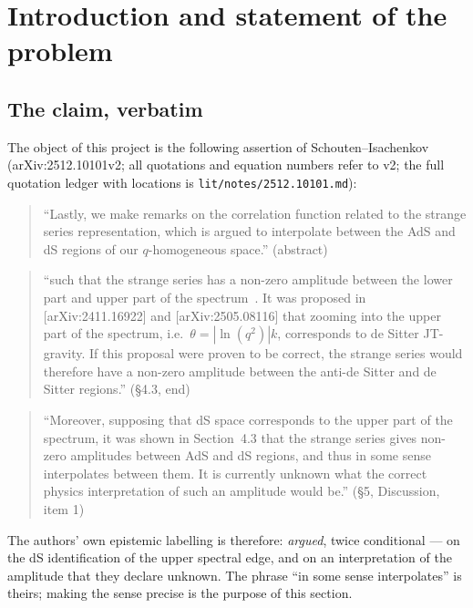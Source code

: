 \documentclass[11pt,a4paper]{article}
\theoremstyle{definition}
\theoremstyle{plain}
\begin{document}
\section{Introduction and statement of the problem}
\label{sec:intro}


\subsection{The claim, verbatim}
\label{sec:claimverbatim}

The object of this project is the following assertion of Schouten--Isachenkov
\cite{Schouten:2025dssyk} (arXiv:2512.10101v2; all quotations and equation numbers refer to v2;
the full quotation ledger with locations is \texttt{lit/notes/2512.10101.md}):

\begin{quote}
``Lastly, we make remarks on the correlation function related to the strange series
representation, which is argued to interpolate between the AdS and dS regions of our
$q$-homogeneous space.'' \hfill (abstract)
\end{quote}
\begin{quote}
``such that the strange series has a non-zero amplitude between the lower part and upper part of
the spectrum~. It was proposed in [arXiv:2411.16922] and [arXiv:2505.08116] that zooming into the
upper part of the spectrum, i.e.\ $\theta=|\ln(q^2)|k$, corresponds to de Sitter JT-gravity.
If this proposal were proven to be correct, the strange series would therefore have a non-zero
amplitude between the anti-de Sitter and de Sitter regions.'' \hfill (\S4.3, end)
\end{quote}
\begin{quote}
``Moreover, supposing that dS space corresponds to the upper part of the spectrum, it was shown
in Section~4.3 that the strange series gives non-zero amplitudes between AdS and dS regions, and
thus in some sense interpolates between them. It is currently unknown what the correct physics
interpretation of such an amplitude would be.'' \hfill (\S5, Discussion, item 1)
\end{quote}

The authors' own epistemic labelling is therefore: \emph{argued}, twice conditional --- on the
dS identification of the upper spectral edge, and on an interpretation of the amplitude that they
declare unknown. The phrase ``in some sense interpolates'' is theirs; making the sense precise is
the purpose of this section.
\end{document}
